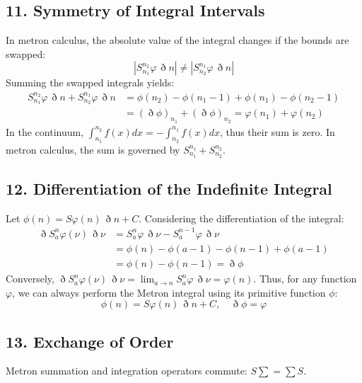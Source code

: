 \documentclass[11pt,a4paper,oneside]{article}
\begin{document}
\subsection{11. Symmetry of Integral Intervals}

In metron calculus, the absolute value of the integral changes if the bounds are swapped:
\begin{equation*}
    |S_{n_1}^{n_2} \varphi \, \eth n| \neq |S_{n_2}^{n_1} \varphi \, \eth n|
\end{equation*}
Summing the swapped integrals yields:
\begin{align*}
    S_{n_1}^{n_2} \varphi \, \eth n + S_{n_2}^{n_1} \varphi \, \eth n &= \phi(n_2) - \phi(n_1 - 1) + \phi(n_1) - \phi(n_2 - 1) \\
    &= (\eth \phi)_{n_1} + (\eth \phi)_{n_2} = \varphi(n_1) + \varphi(n_2)
\end{align*}
In the continuum, $\int_{n_1}^{n_2} f(x)dx = -\int_{n_2}^{n_1} f(x)dx$, thus their sum is zero. In metron calculus, the sum is governed by $S_{n_1}^{n_1} + S_{n_2}^{n_2}$.

\subsection{12. Differentiation of the Indefinite Integral}

Let $\phi(n) = S \varphi(n) \, \eth n + C$. Considering the differentiation of the integral:
\begin{align*}
    \eth S_a^n \varphi(\nu) \, \eth \nu &= S_a^n \varphi \, \eth \nu - S_a^{n-1} \varphi \, \eth \nu \\
    &= \phi(n) - \phi(a-1) - \phi(n-1) + \phi(a-1) \\
    &= \phi(n) - \phi(n-1) = \eth \phi
\end{align*}
Conversely, $\eth S_a^n \varphi(\nu) \, \eth \nu = \lim_{a \to n} S_a^n \varphi \, \eth \nu = \varphi(n)$. Thus, for any function $\varphi$, we can always perform the Metron integral using its primitive function $\phi$:
\begin{equation}
    \phi(n) = S \varphi(n) \, \eth n + C, \quad \eth \phi = \varphi \tag{M5}
\end{equation}

\subsection{13. Exchange of Order}
Metron summation and integration operators commute: $S \sum = \sum S$.
\end{document}
